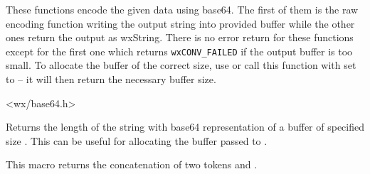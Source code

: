 \label{wxbase64encode}




These functions encode the given data using base64. The first of them is the
raw encoding function writing the output string into provided buffer while the
other ones return the output as wxString. There is no error return for these
functions except for the first one which returns \texttt{wxCONV\_FAILED} if the
output buffer is too small. To allocate the buffer of the correct size, use 
 or call this function with 
 set to \NULL -- it will then return the necessary buffer size.







<wx/base64.h>


\label{wxbase64encodedsize}


Returns the length of the string with base64 representation of a buffer of
specified size . This can be useful for allocating the buffer passed
to .


\label{wxconcat}


This macro returns the concatenation of two tokens  and .


\label{wxdynlibfunction}


